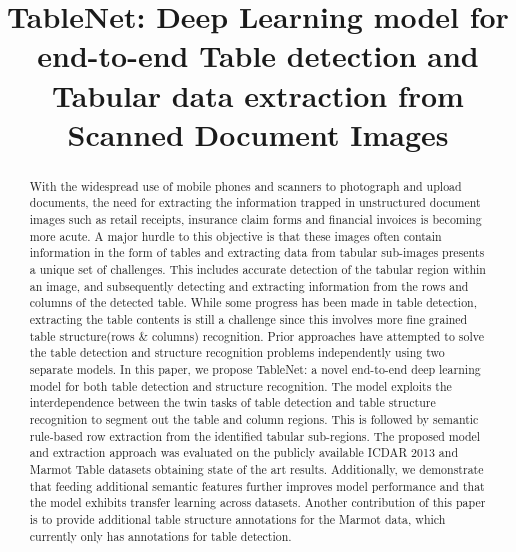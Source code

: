 \documentclass[conference]{IEEEtran}
\begin{document}
\title{TableNet: Deep Learning model for end-to-end Table detection and Tabular data extraction from Scanned Document Images\\
}

\author{
}

\maketitle

\begin{abstract}
With the widespread use of mobile phones and scanners to photograph and upload documents, the need for extracting the information trapped in unstructured document images such as retail receipts, insurance claim forms and financial invoices is becoming more acute.  A major hurdle to this objective is that these images often contain information in the form of tables and extracting data from tabular sub-images presents a unique set of challenges. This includes accurate detection of the tabular region within an image, and subsequently detecting and extracting information from the rows and columns of the detected table. While some progress has been made in table detection, extracting the table contents is still a challenge since this involves more fine grained table structure(rows \& columns) recognition. Prior approaches have attempted to solve the table detection and structure recognition problems independently using two separate models. In this paper, we propose TableNet: a novel end-to-end deep learning model for both table detection and structure recognition. The model exploits  the  interdependence between the twin tasks of table detection and table structure recognition to segment out the table and column regions. This is followed by semantic rule-based row extraction from the identified tabular sub-regions. The proposed model and extraction approach was evaluated on the publicly available ICDAR 2013 and Marmot Table datasets obtaining state of the art results. Additionally, we demonstrate that feeding additional semantic features further improves model performance and that the model exhibits transfer learning across datasets. Another contribution of this paper is to provide additional table structure annotations for the Marmot data, which currently only has annotations for table detection.







\end{abstract}
\end{document}
